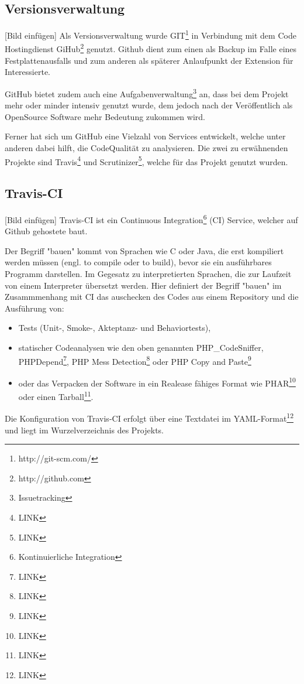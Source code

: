 \subsection{Versionsverwaltung} 
[Bild einfügen]
Als Versionsverwaltung wurde GIT\footnote{http://git-scm.com/} in Verbindung mit dem Code Hostingdienst GiHub\footnote{http://github.com} genutzt. Github dient zum einen als Backup im Falle eines Festplattenausfalls und zum anderen als späterer Anlaufpunkt der Extension für Interessierte.

GitHub bietet zudem auch eine Aufgabenverwaltung\footnote{Issuetracking} an, dass bei dem Projekt mehr oder minder intensiv genutzt wurde, dem jedoch nach der Veröffentlich als OpenSource Software mehr Bedeutung zukommen wird.

Ferner hat sich um GitHub eine Vielzahl von Services entwickelt, welche unter anderen dabei hilft, die CodeQualität zu analysieren. Die zwei zu erwähnenden Projekte sind Travis\footnote{LINK} und Scrutinizer\footnote{LINK}, welche für das Projekt genutzt wurden.


\subsection{Travis-CI}
[Bild einfügen]
Travis-CI ist ein Continuous Integration\footnote{Kontinuierliche Integration} (CI) Service, welcher auf Github gehostete baut.

Der Begriff "bauen" kommt von Sprachen wie C oder Java, die erst kompiliert werden müssen (engl. to compile oder to build), bevor sie ein ausführbares Programm darstellen. Im Gegesatz zu interpretierten Sprachen, die zur Laufzeit von einem Interpreter übersetzt werden. Hier definiert der Begriff "bauen" im Zusammmenhang mit CI das auschecken des Codes aus einem Repository und die Ausführung von:
	\begin{itemize}
		\item Tests (Unit-, Smoke-, Akteptanz- und Behaviortests), 
		\item statischer Codeanalysen wie den oben genannten PHP\_CodeSniffer, PHPDepend\footnote{LINK}, PHP Mess Detection\footnote{LINK} oder PHP Copy and Paste\footnote{LINK} 
		\item oder das Verpacken der Software in ein Realease fähiges Format wie PHAR\footnote{LINK} oder einen Tarball\footnote{LINK}.
	\end{itemize}

Die Konfiguration von Travis-CI erfolgt über eine Textdatei im YAML-Format\footnote{LINK} und liegt im Wurzelverzeichnis des Projekts.

